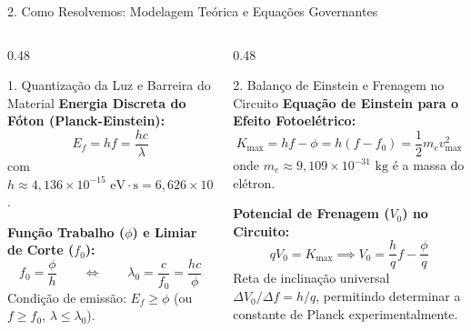 \documentclass[aspectratio=169, 10pt]{beamer}
\begin{document}
\begin{frame}{2. Como Resolvemos: Modelagem Teórica e Equações Governantes}
  \vspace{-0.15cm}
  \begin{columns}[T]
    \begin{column}{0.48\textwidth}
      \begin{block}{1. Quantização da Luz e Barreira do Material}
        \footnotesize
        \textbf{Energia Discreta do Fóton (Planck-Einstein):}
        \[ E_f = h f = \frac{h c}{\lambda} \]
        com $h \approx 4{,}136 \times 10^{-15}\text{ eV}\cdot\text{s} = 6{,}626 \times 10^{-34}\text{ J}\cdot\text{s}$.
        \vspace{0.15cm}

        \textbf{Função Trabalho ($\phi$) e Limiar de Corte ($f_0$):}
        \[ f_0 = \frac{\phi}{h} \qquad \iff \qquad \lambda_0 = \frac{c}{f_0} = \frac{h c}{\phi} \]
        Condição de emissão: $E_f \ge \phi$ (ou $f \ge f_0$, $\lambda \le \lambda_0$).
      \end{block}
    \end{column}

    \begin{column}{0.48\textwidth}
      \begin{block}{2. Balanço de Einstein e Frenagem no Circuito}
        \footnotesize
        \textbf{Equação de Einstein para o Efeito Fotoelétrico:}
        \[ K_{\max} = h f - \phi = h(f - f_0) = \frac{1}{2} m_e v_{\max}^2 \]
        onde $m_e \approx 9{,}109 \times 10^{-31}\text{ kg}$ é a massa do elétron.
        \vspace{0.15cm}

        \textbf{Potencial de Frenagem ($V_0$) no Circuito:}
        \[ q V_0 = K_{\max} \implies V_0 = \frac{h}{q} f - \frac{\phi}{q} \]
        Reta de inclinação universal $\Delta V_0 / \Delta f = h/q$, permitindo determinar a constante de Planck experimentalmente.
      \end{block}
    \end{column}
  \end{columns}
\end{frame}
\end{document}
